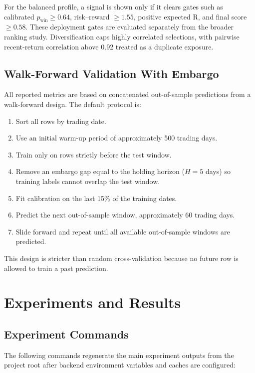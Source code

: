 \documentclass[11pt]{article}
\begin{document}
For the balanced profile, a signal is shown only if it clears gates such as
calibrated $p_{\mathrm{win}} \ge 0.64$, risk--reward $\ge 1.55$, positive
expected R, and final score $\ge 0.58$. These deployment gates are evaluated
separately from the broader ranking study. Diversification caps highly
correlated selections, with pairwise recent-return correlation above 0.92
treated as a duplicate exposure.

\subsection{Walk-Forward Validation With Embargo}

All reported metrics are based on concatenated out-of-sample predictions from a
walk-forward design. The default protocol is:
\begin{enumerate}[leftmargin=*]
    \item Sort all rows by trading date.
    \item Use an initial warm-up period of approximately 500 trading days.
    \item Train only on rows strictly before the test window.
    \item Remove an embargo gap equal to the holding horizon ($H=5$ days) so
    training labels cannot overlap the test window.
    \item Fit calibration on the last 15\% of the training dates.
    \item Predict the next out-of-sample window, approximately 60 trading days.
    \item Slide forward and repeat until all available out-of-sample windows are
    predicted.
\end{enumerate}

This design is stricter than random cross-validation because no future row is
allowed to train a past prediction.

\section{Experiments and Results}

\subsection{Experiment Commands}

The following commands regenerate the main experiment outputs from the project
root after backend environment variables and caches are configured:
\end{document}
